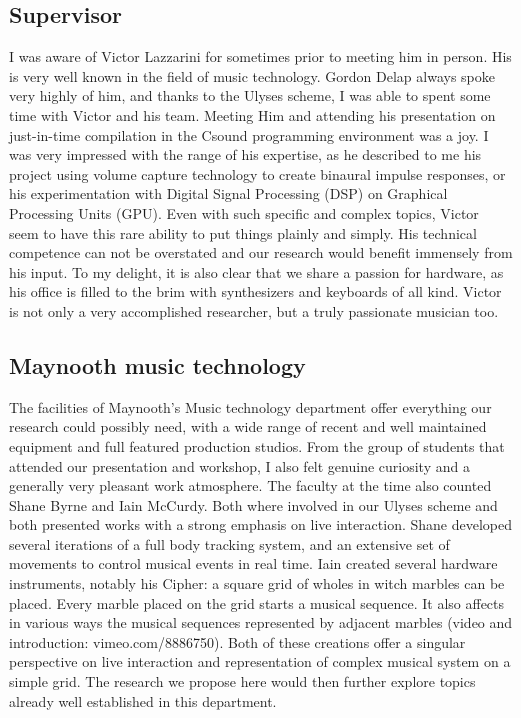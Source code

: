 \documentclass[journal,onecolumn]{IEEEtran}
\begin{document}
\subsection{Supervisor}
I was aware of Victor Lazzarini for sometimes prior to meeting him in person. His is very well known in the field of music technology. Gordon Delap always spoke very highly of him, and thanks to the Ulyses scheme, I was able to spent some time with Victor and his team. Meeting Him and attending his presentation on just-in-time compilation in the Csound programming environment was a joy. I was very impressed with the range of his expertise, as he described to me his project using volume capture technology to create binaural impulse responses, or his experimentation with Digital Signal Processing (DSP) on Graphical Processing Units (GPU). Even with such specific and complex topics, Victor seem to have this rare ability to put things plainly and simply. His technical competence can not be overstated and our research would benefit immensely from his input. To my delight, it is also clear that we share a passion for hardware, as his office is filled to the brim with synthesizers and keyboards of all kind. Victor is not only a very accomplished researcher, but a truly passionate musician too.

\subsection{Maynooth music technology}
The facilities of Maynooth's Music technology department offer everything our research could possibly need, with a wide range of recent and well maintained equipment and full featured production studios. From the group of students that attended our presentation and workshop, I also felt genuine curiosity and a generally very pleasant work atmosphere. The faculty at the time also counted Shane Byrne and Iain McCurdy.
Both where involved in our Ulyses scheme and both presented works with a strong emphasis on live interaction. Shane developed several iterations of a full body tracking system, and an extensive set of movements to control musical events in real time. Iain created several hardware instruments, notably his Cipher: a square grid of wholes in witch marbles can be placed. Every marble placed on the grid starts a musical sequence. It also affects in various ways the musical sequences represented by adjacent marbles (video and introduction: vimeo.com/8886750). Both of these creations offer a singular perspective on live interaction and representation of complex musical system on a simple grid. The research we propose here would then further explore topics already well established in this department.
\end{document}
